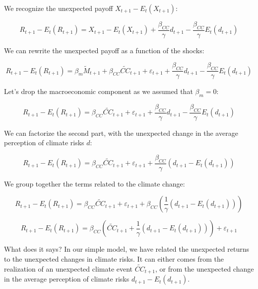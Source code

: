 We recognize the unexpected payoff $X_{t+1} - E_t(X_{t+1})$:

\begin{equation}
    R_{t+1} - E_t(R_{t+1}) = X_{t+1} - E_t(X_{t+1}) + \frac{\beta_{CC}}{\gamma}d_{t+1} - \frac{\beta_{CC}}{\gamma}E_t(d_{t+1})
\end{equation}

We can rewrite the unexpected payoff as a function of the shocks:

\begin{equation}
    R_{t+1} - E_t(R_{t+1}) = \beta_m \tilde{M}_{t+1} + \beta_{CC} \tilde{CC}_{t+1} + \varepsilon_{t+1} + \frac{\beta_{CC}}{\gamma}d_{t+1} - \frac{\beta_{CC}}{\gamma}E_t(d_{t+1})
\end{equation}

Let's drop the macroeconomic component as 
we assumed that $\beta_m = 0$:

\begin{equation}
    R_{t+1} - E_t(R_{t+1}) = \beta_{CC} \tilde{CC}_{t+1} + \varepsilon_{t+1} + \frac{\beta_{CC}}{\gamma}d_{t+1} - \frac{\beta_{CC}}{\gamma}E_t(d_{t+1})
\end{equation}

We can factorize the second part, with
the unexpected change in the average perception of climate risks $d$:

\begin{equation}
    R_{t+1} - E_t(R_{t+1}) = \beta_{CC} \tilde{CC}_{t+1} + \varepsilon_{t+1} + \frac{\beta_{CC}}{\gamma}(d_{t+1} - E_t(d_{t+1}))
\end{equation}

We group together the terms related to the climate change:

\begin{equation}
    R_{t+1} - E_t(R_{t+1}) = \beta_{CC} \tilde{CC}_{t+1} + \varepsilon_{t+1} + \beta_{CC} \left( \frac{1}{\gamma}(d_{t+1} - E_t(d_{t+1})) \right)
\end{equation}

\begin{equation}
    R_{t+1} - E_t(R_{t+1}) = \beta_{CC} \left(\tilde{CC}_{t+1} + \frac{1}{\gamma}(d_{t+1} - E_t(d_{t+1})) \right) + \varepsilon_{t+1}
\end{equation}

What does it says? In our simple model, 
we have related the unexpected returns to the
unexpected changes in climate risks. It can 
either comes from the realization of an 
unexpected climate event $\tilde{CC}_{t+1}$,
or from the unexpected change in the average
perception of climate risks $d_{t+1} - E_t(d_{t+1})$.




